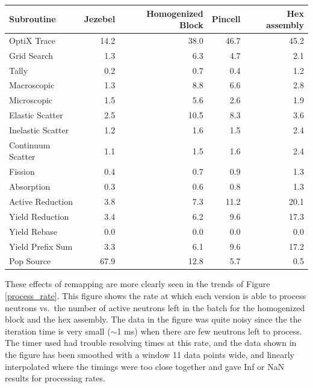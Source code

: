 \begin{table}[h!]
\begin{tabular}{| l | r  | r | r | r |}
 \hline
Subroutine         & Jezebel & Homogenized Block & Pincell & Hex assembly  \\
\hline \hline
 OptiX Trace       & 14.2       &      38.0            &   46.7    &    45.2     \\ \hline
 Grid Search       &  1.3      &        6.3                 &  4.7     &     2.1      \\ \hline
 Tally                   &  0.2      &         0.7               &   0.4    &    1.2       \\ \hline
 Macroscopic      &  1.3     &          8.8               &  6.6      &    2.8     \\ \hline
 Microscopic       &  1.5      &          5.6               &  2.6     &    1.9       \\ \hline
 Elastic Scatter   &  2.5      &        10.5                 &   8.3    &   3.6      \\ \hline
 Inelastic Scatter & 1.2       &        1.6                  &  1.5    &    2.4    \\ \hline
 Continuum Scatter & 1.1  &         1.5                 &   1.6   &    2.4   \\ \hline
 Fission               &  0.4      &         0.7                 &   0.9   &    1.3      \\ \hline
 Absorption          & 0.3       &         0.6                 &   0.8   &    1.3      \\ \hline
Active Reduction  &  3.8      &        7.3                  &   11.2   &  20.1        \\ \hline
 Yield Reduction  &   3.4     &        6.2                 &  9.6    &    17.3     \\ \hline
 Yield Rebase     &    0.0     &       0.0                   &   0.0  &    0.0    \\ \hline
 Yield Prefix Sum &   3.3    &       6.1                    &  9.6   &    17.2    \\ \hline
 Pop Source         &  67.9     &     12.8                    & 5.7    &    0.5    \\ 
\hline
\end{tabular}
\end{table}


These effects of remapping are more clearly seen in the trends of Figure \ref{process_rate}.  This figure shows the rate at which each version is able to process neutrons vs.\ the number of active neutrons left in the batch for the homogenized block and the hex assembly.  The data in the figure was quite noisy since the the iteration time is very small ($\sim$1 ms) when there are few neutrons left to process.  The timer used had trouble resolving times at this rate, and the data shown in the figure has been smoothed with a window 11 data points wide,%
 and linearly interpolated where the timings were too close together and gave Inf or NaN results for processing rates.  
 
